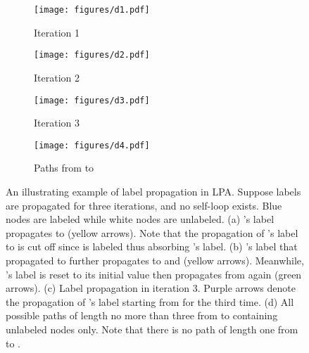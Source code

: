 \documentclass{article}
\begin{document}
		\begin{figure}[t]
		\centering
        \begin{subfigure}[b]{0.2\textwidth}
            \texttt{[image: figures/d1.pdf]}
            \caption{Iteration 1}
            \label{fig:d1}
        \end{subfigure}
        \hfill
        \begin{subfigure}[b]{0.2\textwidth}
            \texttt{[image: figures/d2.pdf]}
            \caption{Iteration 2}
            \label{fig:d2}
        \end{subfigure}
        \hfill
        \begin{subfigure}[b]{0.2\textwidth}
            \texttt{[image: figures/d3.pdf]}
            \caption{Iteration 3}
            \label{fig:d2}
        \end{subfigure}
        \hfill
        \begin{subfigure}[b]{0.2\textwidth}
            \texttt{[image: figures/d4.pdf]}
            \caption{Paths from  to }
            \label{fig:d2}
        \end{subfigure}
        \caption{An illustrating example of label propagation in LPA. Suppose labels are propagated for three iterations, and no self-loop exists. Blue nodes are labeled while white nodes are unlabeled. (a) 's label propagates to  (yellow arrows). Note that the propagation of 's label to  is cut off since  is labeled thus absorbing 's label. (b) 's label that propagated to  further propagates to  and  (yellow arrows). Meanwhile, 's label is reset to its initial value then propagates from  again (green arrows). (c) Label propagation in iteration 3. Purple arrows denote the propagation of 's label starting from  for the third time. (d) All possible paths of length no more than three from  to  containing unlabeled nodes only. Note that there is no path of length one from  to .}
        \label{fig:lemma_2}
    	\end{figure}
		
\end{document}
